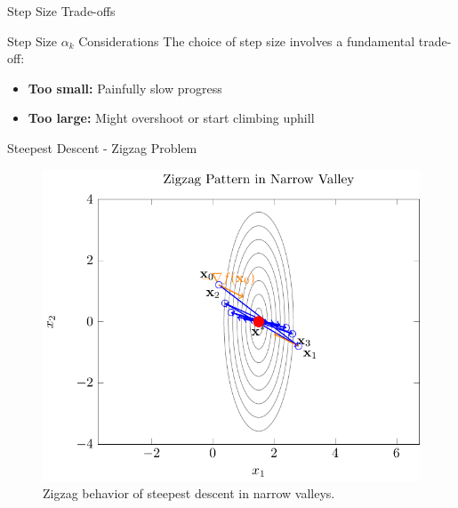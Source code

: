 \documentclass[aspectratio=1610]{beamer}
\begin{document}
\begin{frame}{Step Size Trade-offs}
  \begin{block}{Step Size $\alpha_k$ Considerations}
    The choice of step size involves a fundamental trade-off:
    \begin{itemize}
      \item \textbf{Too small:} Painfully slow progress
      \item \textbf{Too large:} Might overshoot or start climbing uphill
    \end{itemize}
  \end{block}
\end{frame}

\begin{frame}{Steepest Descent - Zigzag Problem}
    \begin{figure}[h]
    \centering
      \includegraphics[height=0.8\textheight]{figures/steepest_zigzag.pdf}
    \caption{Zigzag behavior of steepest descent in narrow valleys.}
  \end{figure}

\end{frame}
\end{document}
